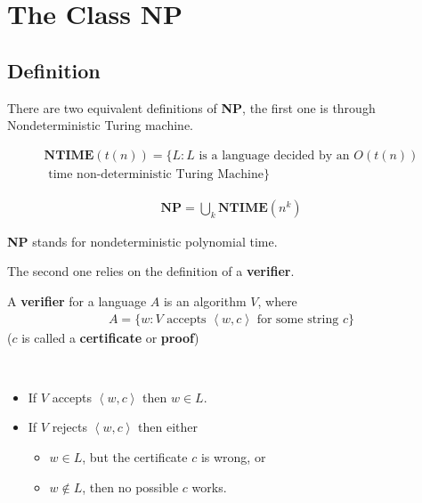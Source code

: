 \setcounter{chapter}{1}
\chapter{The Class NP}
\section{Definition} \label{sec:}
There are two equivalent definitions of \textbf{NP}, the first one is through Nondeterministic Turing machine.
\begin{definition}[NTIME]
\begin{align*}
    \mathbf{NTIME}(t(n)) = \{ L : L \text{ is a language decided by an }O(t(n)) \\\text{ time non-deterministic Turing Machine}\}
\end{align*}
\end{definition}

\begin{definition}[NP]
\begin{align*}
    \mathbf{NP} = \bigcup_{k} \mathbf{NTIME}(n^{k})
\end{align*}
\end{definition}
\begin{note}
    \textbf{NP} stands for nondeterministic polynomial time.
\end{note}
The second one relies on the definition of a \textbf{verifier}.
\begin{definition}[Verifier]
A \textbf{verifier} for a language $A$ is an algorithm $V$, where
\begin{align*}
    A = \{ w : V \text{ accepts } \left<w,c \right> \text{ for some string } c\}
\end{align*}
($c$ is called a \textbf{certificate} or \textbf{proof})
\end{definition}

\begin{observe} ~
    \begin{itemize}
        \item If $V$ accepts $\left<w,c \right>$ then $w \in L$.
        \item If $V$ rejects $\left<w,c \right>$ then either
        \begin{itemize}
            \item $w \in L$, but the certificate $c$ is wrong, or
            \item $w \not \in L$, then no possible $c$ works.
        \end{itemize}
    \end{itemize}
\end{observe}


